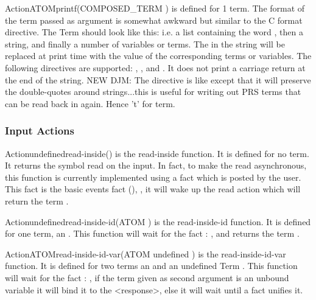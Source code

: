 \begin{typeefa}{Action}{ATOM}{printf}{(COMPOSED\_TERM )}
is defined for 1 term. The format of the term passed as argument is somewhat
awkward but similar to the C format directive. 
The Term should look like this: \*
\*
i.e. a list containing the word , then a string, and finally a
number of variables or terms.  The  in the string will be replaced at
print time with the value of the corresponding terms or variables. The
following directives are supported: , ,  and
. 
It does not print a carriage return at the end of the string.
NEW DJM: The directive  is like 
 except that it will preserve the double-quotes around strings...this is useful
for writing out PRS terms that can be read back in again.  Hence 't' for term.
\end{typeefa}

\subsubsection{Input Actions}

\begin{typeefa}{Action}{undefined}{read-inside}{()}
is the read-inside function. It is defined for no term. It returns the
symbol read on the input. In fact, to make the read asynchronous, this
function is currently implemented using a fact which is posted by the
user.  This fact is the basic events fact (),
, it will wake up the read action which
will return the term .
\end{typeefa}

\begin{typeefa}{Action}{undefined}{read-inside-id}{(ATOM )}
is the read-inside-id function. It is defined for one term, an . This
function will wait for the fact : , and
returns the term .
\end{typeefa}

\begin{typeefa}{Action}{ATOM}{read-inside-id-var}{(ATOM  undefined )}
is the read-inside-id-var function. It is defined for two
terms an   and an undefined Term .  This
function will wait for the fact : , if
the term  given as second argument is an unbound variable it
will bind it to the <response>, else it will wait until a fact unifies it.
\end{typeefa}

